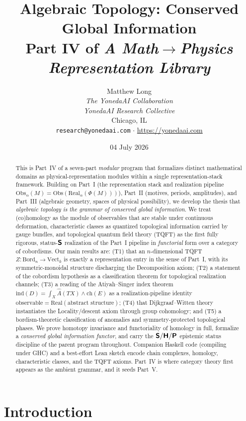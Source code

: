 \documentclass[12pt]{article}
\title{\textbf{Algebraic Topology: Conserved Global Information}\\[0.4em]
\large Part IV of \emph{A Math$\to$Physics Representation Library}}
\author{Matthew Long \\
\textit{The YonedaAI Collaboration} \\
\textit{YonedaAI Research Collective} \\
Chicago, IL \\
\texttt{research@yonedaai.com} $\cdot$ \url{https://yonedaai.com}}
\date{04 July 2026}
\theoremstyle{definition}
\theoremstyle{remark}
\newcommand{\Bord}{\mathrm{Bord}}
\newcommand{\Vect}{\mathrm{Vect}}
\newcommand{\Real}{\mathrm{Real}}
\newcommand{\Obs}{\mathrm{Obs}}
\newcommand{\ind}{\mathrm{ind}}
\newcommand{\ch}{\mathrm{ch}}
\newcommand{\Ahat}{\widehat{A}}
\newcommand{\Sfont}{\textnormal{\sffamily\bfseries S}}
\newcommand{\Hfont}{\textnormal{\sffamily\bfseries H}}
\newcommand{\Pfont}{\textnormal{\sffamily\bfseries P}}
\begin{document}
\maketitle

\begin{abstract}
This is Part~IV of a seven-part \emph{modular} program that formalizes distinct
mathematical domains as physical-representation modules within a single
representation-stack framework. Building on Part~I (the representation stack and
realization pipeline $\Obs_\alpha(M)=\Obs(\Real_\alpha(\Phi(M)))$), Part~II
(motives, periods, amplitudes), and Part~III (algebraic geometry, spaces of
physical possibility), we develop the thesis that \emph{algebraic topology is the
grammar of conserved global information}. We treat (co)homology as the module of
observables that are stable under continuous deformation, characteristic classes
as quantized topological information carried by gauge bundles, and topological
quantum field theory (TQFT) as the first fully rigorous, status-$\Sfont$
realization of the Part~I pipeline in \emph{functorial} form over a category of
cobordisms. Our main results are: (T1) that an $n$-dimensional TQFT
$Z\colon\Bord_n\to\Vect_k$ is exactly a representation entry in the sense of
Part~I, with its symmetric-monoidal structure discharging the Decomposition
axiom; (T2) a statement of the cobordism hypothesis as a classification theorem
for topological realization channels; (T3) a reading of the Atiyah--Singer index
theorem $\ind(D)=\int_X \Ahat(TX)\wedge\ch(E)$ as a realization-pipeline identity
$\text{observable}=\Real(\text{abstract structure})$; (T4) that Dijkgraaf--Witten
theory instantiates the Locality/descent axiom through group cohomology; and (T5)
a bordism-theoretic classification of anomalies and symmetry-protected
topological phases. We prove homotopy invariance and functoriality of homology
in full, formalize a \emph{conserved global information functor}, and carry the
$\Sfont/\Hfont/\Pfont$ epistemic status discipline of the parent program
throughout. Companion Haskell code (compiling under GHC) and a best-effort Lean
sketch encode chain complexes, homology, characteristic classes, and the TQFT
axioms. Part~IV is where category theory first appears as the
ambient grammar, and it seeds Part~V.
\end{abstract}

\tableofcontents

\section{Introduction}
\label{sec:intro}
\end{document}
